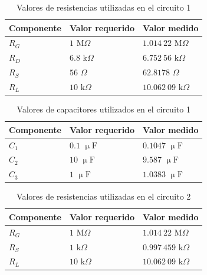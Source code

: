 \documentclass[journal]{IEEEtran}
\begin{document}
\begin{table}[H]
        \centering
        \renewcommand{\arraystretch}{1.5}
        \caption{Valores de resistencias utilizadas en el circuito 1}
        \begin{tabular}{ >{\centering\arraybackslash}m{2.5cm} >{\centering\arraybackslash}m{2.5cm} >{\centering\arraybackslash}m{2.5cm} }
                \hline
            \centering
            Componente & Valor requerido & Valor medido\\ 
            \hline
            \centering
            $R_G$ & $1$ $\mathrm{M}\Omega$ & $1.014~22$ $\mathrm{M}\Omega$ \\ 
            $R_D$ & $6.8$ $\mathrm{k}\Omega$ & $6.752~56$ $\mathrm{k}\Omega$ \\
            $R_S$ & $56$ $\Omega$ & $62.8178$ $\Omega$ \\
            $R_L$ & $10$ $\mathrm{k}\Omega$ & $10.062~09$ $\mathrm{k}\Omega$ \\
            \hline
        \end{tabular}
        \label{tabla1}
    \end{table}
    
\begin{table}[H]
        \centering
        \renewcommand{\arraystretch}{1.5}
        \caption{Valores de capacitores utilizados en el circuito 1}
        \begin{tabular}{ >{\centering\arraybackslash}m{2.5cm} >{\centering\arraybackslash}m{2.5cm} >{\centering\arraybackslash}m{2.5cm} }
                \hline
            Componente & Valor requerido & Valor medido\\ 
            \hline
            \centering
            $C_1$ & $0.1$ $\upmu\mathrm{F}$ & $0.1047$ $\upmu\mathrm{F}$ \\ 
            $C_2$ & $10$ $\upmu\mathrm{F}$ & $9.587$ $\upmu\mathrm{F}$ \\
            $C_3$ & $1$ $\upmu\mathrm{F}$ & $1.0383$ $\upmu\mathrm{F}$ \\
            \hline
        \end{tabular}
        \label{tabla2}
    \end{table}    

\begin{table}[H]
        \centering
        \renewcommand{\arraystretch}{1.5}
        \caption{Valores de resistencias utilizadas en el circuito 2}
        \begin{tabular}{ >{\centering\arraybackslash}m{2.5cm} >{\centering\arraybackslash}m{2.5cm} >{\centering\arraybackslash}m{2.5cm} }
                \hline
            Componente & Valor requerido & Valor medido\\ 
            \hline
            \centering
            $R_G$ & $1$ $\mathrm{M}\Omega$ & $1.014~22$ $\mathrm{M}\Omega$ \\ 
            $R_S$ & $1$ $\mathrm{k}\Omega$ & $0.997~459$ $\mathrm{k}\Omega$ \\
            $R_L$ & $10$ $\mathrm{k}\Omega$ & $10.062~09$ $\mathrm{k}\Omega$ \\
            \hline
        \end{tabular}
        \label{tabla3}
    \end{table}
\end{document}
